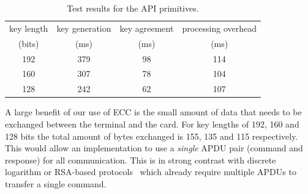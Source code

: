\begin{table}[H]
  \centering
  \caption{Test results for the API primitives.}
  \label{tab:primitives}
  \renewcommand{\tabcolsep}{1.25mm}
  \renewcommand{\arraystretch}{1.25}
  \begin{tabular}{| c || c | c | c |}\hline
    key length & key generation & key agreement & processing overhead \\
    (bits) & (ms) & (ms) & (ms) \\\hline
    \hline
    192 & 379 & 98 & 114 \\\hline
    160 & 307 & 78 & 104 \\\hline
    128 & 242 & 62 & 107 \\\hline
  \end{tabular}
\end{table}

A large benefit of our use of ECC is the small amount of data that needs to be
exchanged between the terminal and the card. For key lengths of 192, 160 and 128
bits the total amount of bytes exchanged is 155, 135 and 115 respectively. This
would allow an implementation to use a \emph{single} APDU pair (command and
response) for all communication. This is in strong contrast with discrete
logarithm or RSA-based protocols~\cite{Sterckx09,TewsJacobs09} which already
require multiple APDUs to transfer a single command.

%
%
